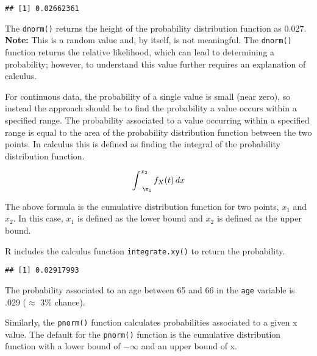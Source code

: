 \documentclass[]{article}
\newenvironment{Shaded}{\begin{snugshade}}{\end{snugshade}}
\newcommand{\KeywordTok}[1]{\textcolor[rgb]{0.13,0.29,0.53}{\textbf{#1}}}
\newcommand{\DecValTok}[1]{\textcolor[rgb]{0.00,0.00,0.81}{#1}}
\newcommand{\OperatorTok}[1]{\textcolor[rgb]{0.81,0.36,0.00}{\textbf{#1}}}
\newcommand{\NormalTok}[1]{#1}
\begin{document}
\begin{verbatim}
## [1] 0.02662361
\end{verbatim}

The \texttt{dnorm()} returns the height of the probability distribution
function as 0.027. \textbf{Note:} This is a random value and, by itself,
is not meaningful. The \texttt{dnorm()} function returns the relative
likelihood, which can lead to determining a probability; however, to
understand this value further requires an explanation of calculus.

For continuous data, the probability of a single value is small (near
zero), so instead the approach should be to find the probability a value
occurs within a specified range. The probability associated to a value
occurring within a specified range is equal to the area of the
probability distribution function between the two points. In calculus
this is defined as finding the integral of the probability distribution
function.

\[\int_{-\x_1}^{x_2}{f_X(t)\,dx}\]

The above formula is the cumulative distribution function for two
points, \(x_1\) and \(x_2\). In this case, \(x_1\) is defined as the
lower bound and \(x_2\) is defined as the upper bound.

R includes the calculus function \texttt{integrate.xy()} to return the
probability.

\begin{Shaded}
\end{Shaded}

\begin{verbatim}
## [1] 0.02917993
\end{verbatim}

The probability associated to an age between 65 and 66 in the
\texttt{age} variable is .029 (\(\approx\) 3\% chance).

Similarly, the \texttt{pnorm()} function calculates probabilities
associated to a given x value. The default for the \texttt{pnorm()}
function is the cumulative distribution function with a lower bound of
\(-\infty\) and an upper bound of x.
\end{document}
